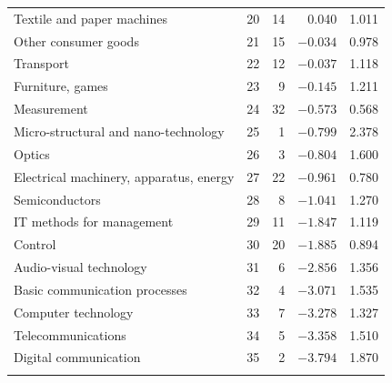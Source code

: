 \documentclass[lineno,pdflatex,sn-mathphys-num]{sn-jnl}%
\theoremstyle{thmstyleone}%
\theoremstyle{thmstyletwo}%
\theoremstyle{thmstylethree}%
\begin{document}
\begin{appendices}
\begin{table}[ht]
\begin{tabular}{lrrrr}
Textile and paper machines & 20 & 14 & 0.040 & 1.011 \\
Other consumer goods & 21 & 15 & $-0.034$ & 0.978 \\
Transport & 22 & 12 & $-0.037$ & 1.118 \\
Furniture, games & 23 & 9 & $-0.145$ & 1.211 \\
Measurement & 24 & 32 & $-0.573$ & 0.568 \\
Micro-structural and nano-technology & 25 & 1 & $-0.799$ & 2.378 \\
Optics & 26 & 3 & $-0.804$ & 1.600 \\
Electrical machinery, apparatus, energy & 27 & 22 & $-0.961$ & 0.780 \\
Semiconductors & 28 & 8 & $-1.041$ & 1.270 \\
IT methods for management & 29 & 11 & $-1.847$ & 1.119 \\
Control & 30 & 20 & $-1.885$ & 0.894 \\
Audio-visual technology & 31 & 6 & $-2.856$ & 1.356 \\
Basic communication processes & 32 & 4 & $-3.071$ & 1.535 \\
Computer technology & 33 & 7 & $-3.278$ & 1.327 \\
Telecommunications & 34 & 5 & $-3.358$ & 1.510 \\
Digital communication & 35 & 2 & $-3.794$ & 1.870 \\
\botrule
\end{tabular}
\end{table}

\end{appendices}


\end{document}
